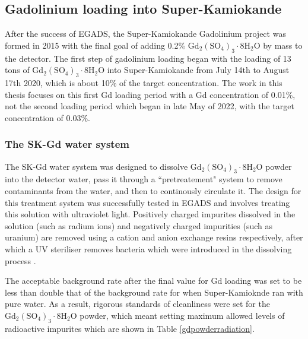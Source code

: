 \subsection{Gadolinium loading into Super-Kamiokande}

After the success of EGADS, the Super-Kamiokande Gadolinium project was formed in 2015 with the final goal of adding 0.2\% $\mathrm{Gd}_{2}\left(\mathrm{SO}_{4}\right)_{3} \cdot 8 \mathrm{H}_{2} \mathrm{O}$ by mass to the detector. The first step of gadolinium loading began with the loading of 13 tons of $\mathrm{Gd}_{2}\left(\mathrm{SO}_{4}\right)_{3} \cdot 8 \mathrm{H}_{2} \mathrm{O}$ into Super-Kamiokande from July 14th to August 17th 2020, which is about 10\% of the target concentration. The work in this thesis focuses on this first Gd loading period with a Gd concentration of 0.01\%, not the second loading period which began in late May of 2022, with the target concentration of 0.03\%.

\subsubsection{The SK-Gd water system}

The SK-Gd water system was designed to dissolve $\mathrm{Gd}_{2}\left(\mathrm{SO}_{4}\right)_{3} \cdot 8 \mathrm{H}_{2} \mathrm{O}$ powder into the detector water, pass it through a ``pretreatement" system to remove contaminants from the water, and then to continously circulate it. The design for this treatment system was successfully tested in EGADS and involves treating this solution with ultraviolet light. Positively charged impurites dissolved in the solution (such as radium ions) and negatively charged impurities (such as uranium) are removed using a cation and anion exchange resins respectively, after which a UV steriliser removes bacteria which were introduced in the dissolving process \cite{10.1093/ptep/ptac170}. 

The acceptable background rate after the final value for Gd loading  was set to be less than double that of the background rate for when Super-Kamioknde ran with pure water. As a result, rigorous standards of cleanliness were set for the $\mathrm{Gd}_{2}\left(\mathrm{SO}_{4}\right)_{3} \cdot 8 \mathrm{H}_{2} \mathrm{O}$ powder, which meant setting maximum allowed levels of radioactive impurites which are shown in Table \ref{gdpowderradiation}.


